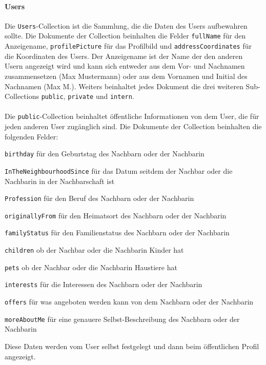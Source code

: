 \paragraph{Users}
Die \texttt{Users}-Collection ist die Sammlung, die die Daten des Users aufbewahren sollte. Die Dokumente der Collection beinhalten die Felder \texttt{fullName} für den Anzeigename, \texttt{profilePicture} für das Profilbild und \texttt{addressCoordinates} für die Koordinaten des Users. Der Anzeigename ist der Name der den anderen Usern angezeigt wird und kann sich entweder aus dem Vor- und Nachnamen zusammensetzen (Max Mustermann) oder aus dem Vornamen und Initial des Nachnamen (Max M.). Weiters beinhaltet jedes Dokument die drei weiteren Sub-Collections \texttt{public}, \texttt{private} und \texttt{intern}.
\\\\
Die \texttt{public}-Collection beinhaltet öffentliche Informationen von dem User, die für jeden anderen User zugänglich sind. Die Dokumente der Collection beinhalten die folgenden Felder:
\begin{compactitem}
  \item \texttt{birthday} für den Geburtstag des Nachbarn oder der Nachbarin
  \item \texttt{InTheNeighbourhoodSince} für das Datum seitdem der Nachbar oder die Nachbarin in der Nachbarschaft ist
  \item \texttt{Profession} für den Beruf des Nachbarn oder der Nachbarin
  \item \texttt{originallyFrom} für den Heimatsort des Nachbarn oder der Nachbarin
  \item \texttt{familyStatus} für den Familienstatus des Nachbarn oder der Nachbarin
  \item \texttt{children} ob der Nachbar oder die Nachbarin Kinder hat
  \item \texttt{pets} ob der Nachbar oder die Nachbarin Haustiere hat
  \item \texttt{interests} für die Interessen des Nachbarn oder der Nachbarin
  \item \texttt{offers} für was angeboten werden kann von dem Nachbarn oder der Nachbarin
  \item \texttt{moreAboutMe} für eine genauere Selbst-Beschreibung des Nachbarn oder der Nachbarin
\end{compactitem}
Diese Daten werden vom User selbst festgelegt und dann beim öffentlichen Profil angezeigt.
\\\\
